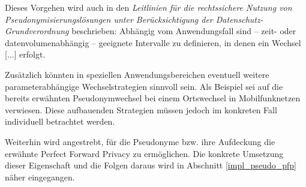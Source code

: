Dieses Vorgehen wird auch in den \textit{Leitlinien für die rechtssichere Nutzung von Pseudonymisierungslösungen unter Berücksichtigung der Datenschutz-Grundverordnung} beschrieben: \glqq Abhängig vom Anwendungsfall sind – zeit- oder datenvolumenabhängig – geeignete Intervalle zu definieren, in denen ein Wechsel [...] erfolgt.\grqq{}\cite{schwartmann2017} 

Zusätzlich könnten in speziellen Anwendungsbereichen eventuell weitere parameterabhängige Wechselstrategien sinnvoll sein. Als Beispiel sei auf die bereits erwähnten Pseudonymwechsel bei einem Ortswechsel in Mobilfunknetzen verwiesen. Diese aufbauenden Strategien müssen jedoch im konkreten Fall individuell betrachtet werden.

Weiterhin wird angestrebt, für die Pseudonyme bzw. ihre Aufdeckung die erwähnte Perfect Forward Privacy zu ermöglichen. Die konkrete Umsetzung dieser Eigenschaft und die Folgen daraus wird in Abschnitt \ref{impl_pseudo_pfp} näher eingegangen.